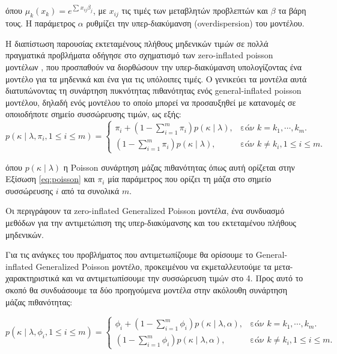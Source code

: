 όπου $\mu_k(x_k) = e^{\sum_{}^{} x_{ij} \beta_j}$, με $x_{ij}$ τις τιμές των μεταβλητών προβλεπτών και $\beta$ τα βάρη τους. Η παράμετρος $\alpha$ ρυθμίζει την υπερ-διακύμανση (overdispersion) του μοντέλου.

Η διαπίστωση παρουσίας εκτεταμένους πλήθους μηδενικών τιμών σε πολλά πραγματικά προβλήματα οδήγησε στο σχηματισμό των zero-inflated poisson μοντέλων \citep{Lambert:1992:ZPR:149268.149270}, που προσπαθούν να διορθώσουν την υπερ-διακύμανση υπολογίζοντας ένα μοντέλο για τα μηδενικά και ένα για τις υπόλοιπες τιμές. Ο \citet{gip} γενικεύει τα μοντέλα αυτά διατυπώνοντας τη συνάρτηση πυκνότητας πιθανότητας ενός general-inflated poisson μοντέλου, δηλαδή ενός μοντέλου το οποίο μπορεί να προσαυξηθεί με κατανομές σε οποιοδήποτε σημείο συσσώρευσης τιμών, ως εξής: 
\begin{equation}
 p(\kappa \mid \lambda, \pi_i, 1 \leq i \leq m) = \begin{cases}
 \pi_i + (1-\sum_{i=1}^{m} \pi_i) p(\kappa \mid \lambda) , & \text{εάν $k=k_1, \cdots, k_m$}.\\
 (1-\sum_{i=1}^{m} \pi_i) p(\kappa \mid \lambda), & \text{εάν $k \neq k_i, 1 \leq i \leq m$}.
 \end{cases}
\end{equation}

όπου $p(\kappa \mid \lambda)$ η Poisson συνάρτηση μάζας πιθανότητας όπως αυτή ορίζεται στην Εξίσωση \ref{eq:poisson} και $\pi_i$ μία παράμετρος που ορίζει τη μάζα στο σημείο συσσώρευσης $i$ από τα συνολικά $m$.

Οι \citet{Famoye_onthe} περιγράφουν τα zero-inflated Generalized Poisson μοντέλα, ένα συνδυασμό μεθόδων για την αντιμετώπιση της υπερ-διακύμανσης και του εκτεταμένου πλήθους μηδενικών. 

Για τις ανάγκες του προβλήματος που αντιμετωπίζουμε θα ορίσουμε το General-inflated Genera\-lized Poisson μοντέλο, προκειμένου να εκμεταλλευτούμε τα μετα-χαρακτηριστικά και να αντιμετωπίσουμε την συσσώρευση τιμών στο 4. Προς αυτό το σκοπό θα συνδυάσουμε τα δύο προηγούμενα μοντέλα στην ακόλουθη συνάρτηση μάζας πιθανότητας:

\begin{equation}
 p(\kappa \mid \lambda, \phi_i, 1 \leq i \leq m) = \begin{cases}
 \phi_i + (1-\sum_{i=1}^{m} \phi_i) p(\kappa \mid \lambda, \alpha) , & \text{εάν $k=k_1, \cdots, k_m$}.\\
 (1-\sum_{i=1}^{m} \phi_i) p(\kappa \mid \lambda, \alpha), & \text{εάν $k \neq k_i, 1 \leq i \leq m$}.
 \end{cases}
\end{equation} 
 
